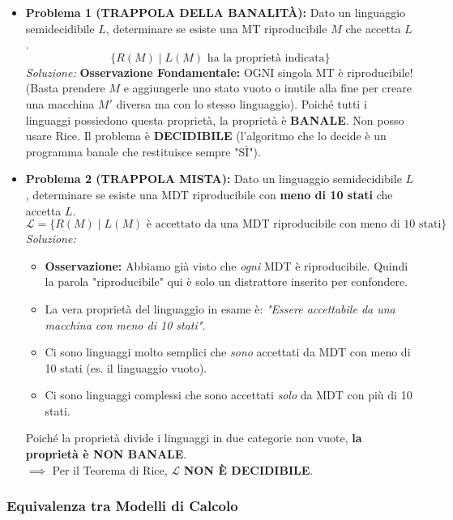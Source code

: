 \begin{itemize}
    \item \textbf{Problema 1 (TRAPPOLA DELLA BANALITÀ):} 
    Dato un linguaggio semidecidibile $L$, determinare se esiste una MT riproducibile $M$ che accetta $L$.
    $$ \{ R(M) \mid L(M) \text{ ha la proprietà indicata} \} $$
    \textit{Soluzione:} \textbf{Osservazione Fondamentale:} OGNI singola MT è riproducibile! (Basta prendere $M$ e aggiungerle uno stato vuoto o inutile alla fine per creare una macchina $M'$ diversa ma con lo stesso linguaggio).
    Poiché tutti i linguaggi possiedono questa proprietà, la proprietà è \textbf{BANALE}. Non posso usare Rice. 
    Il problema è \textbf{DECIDIBILE} (l'algoritmo che lo decide è un programma banale che restituisce sempre "SÌ").
    \vspace{0.4cm}
    \item \textbf{Problema 2 (TRAPPOLA MISTA):} 
    Dato un linguaggio semidecidibile $L$, determinare se esiste una MDT riproducibile con \textbf{meno di 10 stati} che accetta $L$.
    $$ \mathcal{L} = \{ R(M) \mid L(M) \text{ è accettato da una MDT riproducibile con meno di 10 stati} \} $$
    \textit{Soluzione:} 
    \begin{itemize}
        \item \textbf{Osservazione:} Abbiamo già visto che \textit{ogni} MDT è riproducibile. Quindi la parola "riproducibile" qui è solo un distrattore inserito per confondere. 
        \item La vera proprietà del linguaggio in esame è: \textit{"Essere accettabile da una macchina con meno di 10 stati"}.
        \item Ci sono linguaggi molto semplici che \textit{sono} accettati da MDT con meno di 10 stati (es. il linguaggio vuoto).
        \item Ci sono linguaggi complessi che sono accettati \textit{solo} da MDT con più di 10 stati.
    \end{itemize}
    Poiché la proprietà divide i linguaggi in due categorie non vuote, \textbf{la proprietà è NON BANALE}. \\
    $\implies$ Per il Teorema di Rice, $\mathcal{L}$ \textbf{NON È DECIDIBILE}.
\end{itemize}

\vspace{0.6cm}

\subsubsection{Equivalenza tra Modelli di Calcolo}

